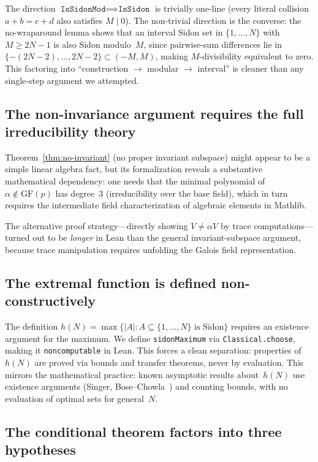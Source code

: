\documentclass[11pt,a4paper]{article}
\begin{document}
The direction $\texttt{IsSidonMod}\implies\texttt{IsSidon}$ is trivially
one-line (every literal collision $a+b=c+d$ also satisfies $M \mid 0$).
The non-trivial direction is the converse: the no-wraparound lemma shows
that an interval Sidon set in $\{1,\dots,N\}$ with $M \ge 2N-1$ is also
Sidon modulo~$M$, since pairwise-sum differences lie in $\{-(2N-2),\dots,2N-2\}
\subset (-M,M)$, making $M$-divisibility equivalent to zero.
This factoring into ``construction $\to$ modular $\to$ interval''
is cleaner than any single-step argument we attempted.

\subsection{The non-invariance argument requires the full irreducibility theory}

Theorem~\ref{thm:no-invariant} (no proper invariant subspace) might appear to be
a simple linear algebra fact, but its formalization reveals a substantive
mathematical dependency: one needs that the minimal polynomial of
$\alpha \notin \mathrm{GF}(p)$ has degree~3 (irreducibility over the base
field), which in turn requires the intermediate field characterization of
algebraic elements in Mathlib.

The alternative proof strategy---directly showing $V \ne \alpha V$ by trace
computations---turned out to be \emph{longer} in Lean than the general
invariant-subspace argument, because trace manipulation requires unfolding the
Galois field representation.

\subsection{The extremal function is defined non-constructively}

The definition $h(N) = \max\{|A| : A \subseteq \{1,\dots,N\} \text{ is Sidon}\}$
requires an existence argument for the maximum.
We define \texttt{sidonMaximum} via \texttt{Classical.choose}, making it
\texttt{noncomputable} in Lean.  This forces a clean separation: properties
of $h(N)$ are proved via bounds and transfer theorems, never by evaluation.
This mirrors the mathematical practice: known asymptotic results about~$h(N)$
use existence arguments (Singer, Bose--Chowla~\cite{BoseChowla1962}) and
counting bounds, with no evaluation of optimal sets for general~$N$.

\subsection{The conditional theorem factors into three hypotheses}
\end{document}
